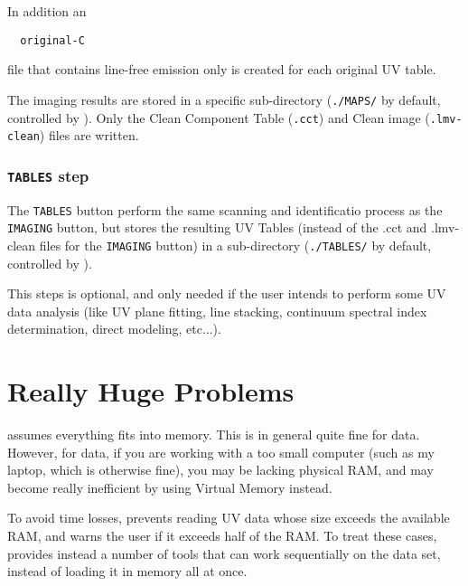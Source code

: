   In addition an
\begin{verbatim}
  original-C
\end{verbatim}
file that contains line-free emission only is created for each
original UV table. 

  The imaging results are stored in a specific sub-directory 
(\texttt{./MAPS/} by default, controlled by ). Only 
the Clean Component Table (\texttt{.cct}) and Clean image 
(\texttt{.lmv-clean}) files are written.

\subsubsection{\texttt{TABLES} step}

The \texttt{TABLES} button perform the same scanning and
identificatio process as the \texttt{IMAGING} button, but stores
the resulting UV Tables (instead of the .cct and .lmv-clean files for
the \texttt{IMAGING} button) in a sub-directory (\texttt{./TABLES/}
by default, controlled by ).

  This steps is optional, and only needed if the user intends to 
perform some UV data analysis (like UV plane fitting, line stacking,
continuum spectral index determination, direct modeling, etc...).

\section{Really Huge Problems}

\imager{} assumes everything fits into memory. This is in general
quite fine for \NOEMA{}  data. However, for \ALMA{} data, if you are 
working with a too small computer (such as my laptop, which is 
otherwise fine), you may be lacking physical RAM, and \imager{} may 
become really inefficient by using Virtual Memory instead.

To avoid time losses, \imager{} prevents reading UV data whose size
exceeds the available RAM, and warns the user if it exceeds half
of the RAM.  To treat these cases, \imager{} provides instead
a number of tools that can work sequentially on the data set,
instead of loading it in memory all at once. 

